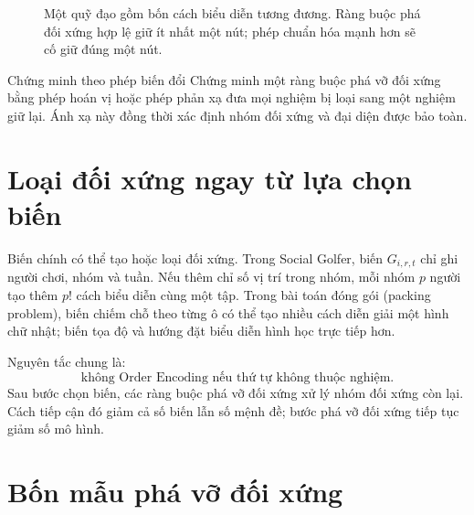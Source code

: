 \begin{figure}[tb]
\centering
{}
\caption{Một quỹ đạo gồm bốn cách biểu diễn tương đương. Ràng buộc phá đối
xứng hợp lệ giữ ít nhất một nút; phép chuẩn hóa mạnh hơn sẽ cố giữ đúng một nút.}
\label{fig:symmetry-orbit}
\end{figure}

\begin{designrule}{Chứng minh theo phép biến đổi}
Chứng minh một ràng buộc phá vỡ đối xứng bằng phép hoán vị hoặc phép phản xạ đưa mọi nghiệm bị
loại sang một nghiệm giữ lại. Ánh xạ này đồng thời xác định nhóm đối xứng và
đại diện được bảo toàn.
\end{designrule}

\section{Loại đối xứng ngay từ lựa chọn biến}

Biến chính có thể tạo hoặc loại đối xứng. Trong Social Golfer, biến
\(G_{i,r,t}\) chỉ ghi người chơi, nhóm và tuần. Nếu thêm chỉ số vị trí trong
nhóm, mỗi nhóm \(p\) người tạo thêm \(p!\) cách biểu diễn cùng một tập.
Trong bài toán đóng gói (packing problem), biến chiếm chỗ theo từng ô có thể tạo nhiều cách diễn
giải một hình chữ nhật; biến tọa độ và hướng đặt biểu diễn hình học trực tiếp hơn.

Nguyên tắc chung là:
\[
  \text{không Order Encoding nếu thứ tự không thuộc nghiệm.}
\]
Sau bước chọn biến, các ràng buộc phá vỡ đối xứng xử lý nhóm đối xứng còn lại.
Cách tiếp cận đó giảm cả số biến lẫn số mệnh đề; bước phá vỡ đối xứng tiếp tục
giảm số mô hình.

\section{Bốn mẫu phá vỡ đối xứng}

